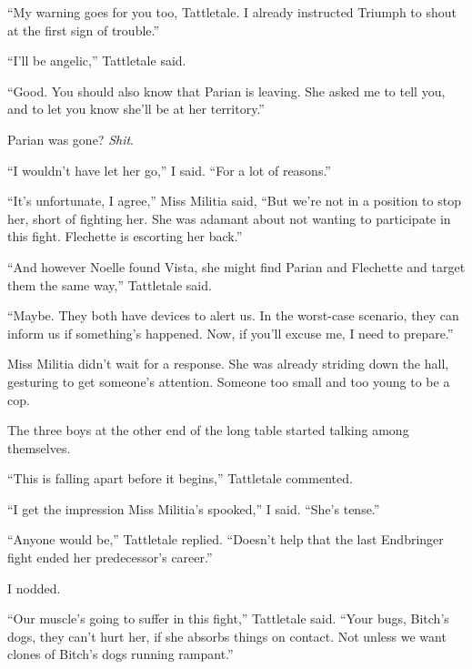 ``My warning goes for you too, Tattletale.  I already instructed Triumph to shout at the first sign of trouble.''



``I'll be angelic,'' Tattletale said.



``Good.  You should also know that Parian is leaving.  She asked me to tell you, and to let you know she'll be at her territory.''



Parian was gone?  \emph{Shit}.



``I wouldn't have let her go,'' I said.  ``For a lot of reasons.''



``It's unfortunate, I agree,'' Miss Militia said, ``But we're not in a position to stop her, short of fighting her.  She was adamant about not wanting to participate in this fight.  Flechette is escorting her back.''



``And however Noelle found Vista, she might find Parian and Flechette and target them the same way,'' Tattletale said.



``Maybe.  They both have devices to alert us.  In the worst-case scenario, they can inform us if something's happened.  Now, if you'll excuse me, I need to prepare.''



Miss Militia didn't wait for a response.  She was already striding down the hall, gesturing to get someone's attention.  Someone too small and too young to be a cop.



The three boys at the other end of the long table started talking among themselves.



``This is falling apart before it begins,'' Tattletale commented.



``I get the impression Miss Militia's spooked,'' I said.  ``She's tense.''



``Anyone would be,'' Tattletale replied.  ``Doesn't help that the last Endbringer fight ended her predecessor's career.''



I nodded.



``Our muscle's going to suffer in this fight,'' Tattletale said.  ``Your bugs, Bitch's dogs, they can't hurt her, if she absorbs things on contact.  Not unless we want clones of Bitch's dogs running rampant.''



